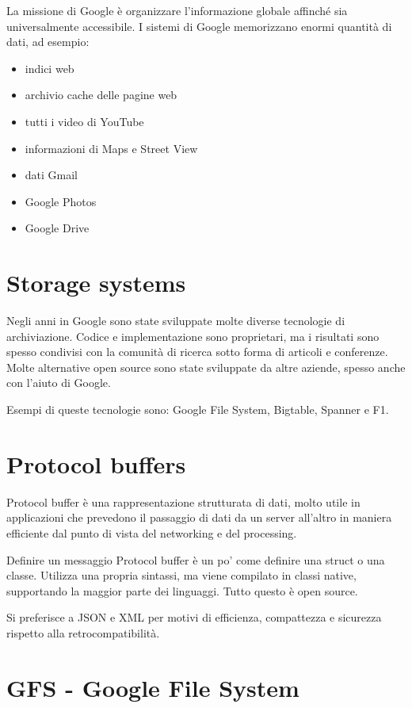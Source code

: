 La missione di Google è organizzare l'informazione globale affinché sia universalmente accessibile. I sistemi di Google memorizzano enormi quantità di dati, ad esempio: 

\begin{itemize}
    \item indici web
    \item archivio cache delle pagine web
    \item tutti i video di YouTube
    \item informazioni di Maps e Street  View
    \item dati Gmail
    \item Google Photos
    \item Google Drive
\end{itemize}

\section{Storage systems}

Negli anni in Google sono state sviluppate molte diverse tecnologie di archiviazione. Codice e implementazione sono proprietari, ma i risultati sono spesso condivisi con la comunità di ricerca sotto forma di articoli e conferenze. Molte alternative open source sono state sviluppate da altre aziende, spesso anche con l'aiuto di Google.

Esempi di queste tecnologie sono: Google File System, Bigtable, Spanner e F1.

\section{Protocol buffers}

Protocol buffer è una rappresentazione strutturata di dati, molto utile in applicazioni che prevedono il passaggio di dati da un server all'altro in maniera efficiente dal punto di vista del networking e del processing. 

Definire un messaggio Protocol buffer è un po' come definire una struct o una classe. Utilizza una propria sintassi, ma viene compilato in classi native, supportando la maggior parte dei linguaggi. Tutto questo è open source.

Si preferisce a JSON e XML per motivi di efficienza, compattezza e sicurezza rispetto alla retrocompatibilità.

\section{GFS - Google File System}

